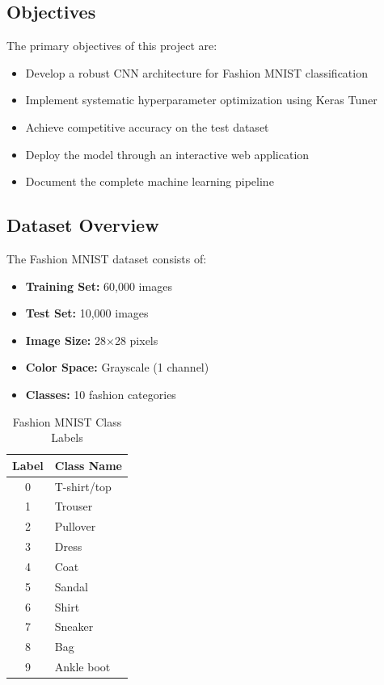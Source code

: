 \documentclass[12pt,a4paper]{article}
\begin{document}
\subsection{Objectives}
The primary objectives of this project are:
\begin{itemize}
    \item Develop a robust CNN architecture for Fashion MNIST classification
    \item Implement systematic hyperparameter optimization using Keras Tuner
    \item Achieve competitive accuracy on the test dataset
    \item Deploy the model through an interactive web application
    \item Document the complete machine learning pipeline
\end{itemize}

\subsection{Dataset Overview}
The Fashion MNIST dataset consists of:
\begin{itemize}
    \item \textbf{Training Set:} 60,000 images
    \item \textbf{Test Set:} 10,000 images
    \item \textbf{Image Size:} 28×28 pixels
    \item \textbf{Color Space:} Grayscale (1 channel)
    \item \textbf{Classes:} 10 fashion categories
\end{itemize}

\begin{table}[H]
\centering
\caption{Fashion MNIST Class Labels}
\begin{tabular}{cl}
\toprule
\textbf{Label} & \textbf{Class Name} \\
\midrule
0 & T-shirt/top \\
1 & Trouser \\
2 & Pullover \\
3 & Dress \\
4 & Coat \\
5 & Sandal \\
6 & Shirt \\
7 & Sneaker \\
8 & Bag \\
9 & Ankle boot \\
\bottomrule
\end{tabular}
\end{table}
\end{document}
